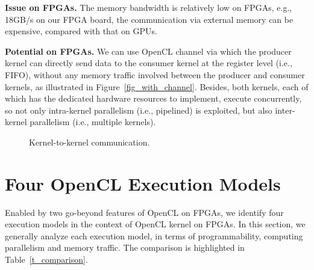 {\bf Issue on FPGAs. }The memory bandwidth is relatively low on FPGAs, e.g., 18GB/s on our FPGA board, the communication via external memory can be expensive, compared with that on GPUs. 

{\bf Potential on FPGAs. }We can use OpenCL channel via which the producer kernel can directly send data to the consumer kernel at the register level (i.e., FIFO), without any memory traffic involved between the producer and consumer kernels, as illustrated in Figure~\ref{fig_with_channel}. Besides, both kernels, each of which has the dedicated hardware resources to implement, execute concurrently, so not only intra-kernel parallelism (i.e., pipelined) is exploited, but also inter-kernel parallelism (i.e., multiple kernels).  
\begin{figure}
	\centering
	\vspace{-2ex}	
	\caption{Kernel-to-kernel communication.} %
	\label{fig_kkc} 
	\vspace{-2ex}
\end{figure}  




\vspace{-1ex}
\section{Four OpenCL Execution Models}
\label{sec_execution_models}
Enabled by two go-beyond features of OpenCL on FPGAs, we identify four execution models in the context of OpenCL kernel on FPGAs. In this section, we generally analyze each execution model, in terms of programmability, computing parallelism and memory traffic. The comparison is highlighted in Table~\ref{t_comparison}.%

